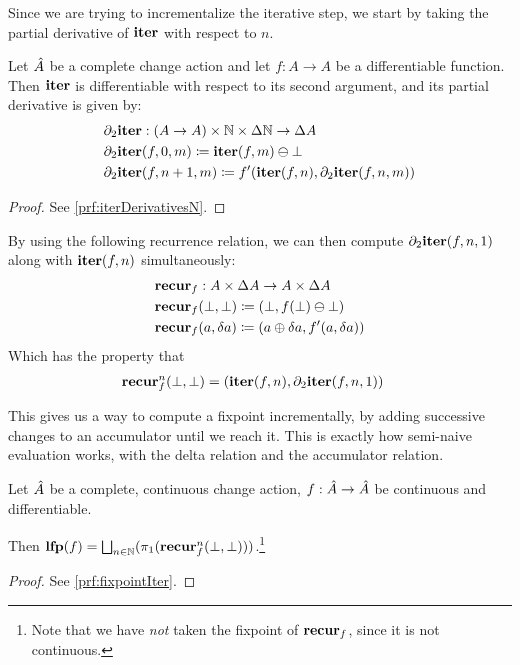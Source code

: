 Since we are trying to incrementalize the iterative step, we start by taking the partial
derivative of $\mathbf{iter}$ with respect to $n$.

\begin{prop}[name=Derivative of the iteration map with respect to $n$, restate=iterDerivativesN]
  \label{prop:iterDerivativesN}
  Let $\hat{A}$ be a complete change action and let $f: A \rightarrow A$ be a differentiable function. 
  Then $\mathbf{iter}$ is differentiable with respect to its second
  argument, and its partial derivative is given by:
  \begin{align*}
    &\partial_2{\mathbf{iter}}: (A \rightarrow A) \times \mathbb{N} \times \Delta \mathbb{N} \rightarrow \Delta A\\
    &\partial_2{\mathbf{iter}}(f, 0, m) \coloneqq \mathbf{iter}(f, m) \ominus \bot\\
    &\partial_2{\mathbf{iter}}(f, n+1, m) \coloneqq f'(\mathbf{iter}(f, n), \partial_2{\mathbf{iter}}(f, n, m))
  \end{align*}
\end{prop}
\ifproofs
\begin{proof}
  See \cref{prf:iterDerivativesN}.
\end{proof}
\fi

By using the following recurrence relation, 
we can then compute $\partial_2{\mathbf{iter}}(f, n, 1)$ along with $\mathbf{iter}(f, n)$ simultaneously:
\begin{align*}
  &\mathbf{recur}_f : A \times \Delta A \rightarrow A \times \Delta A\\
  &\mathbf{recur}_f (\bot, \bot) \coloneqq (\bot, f(\bot) \ominus \bot)\\
  &\mathbf{recur}_f (a, \delta a) \coloneqq (a \oplus \delta a, f'(a, \delta a))
\end{align*}
Which has the property that
\begin{align*}
  &\mathbf{recur}_f^n (\bot, \bot) = (\mathbf{iter}(f, n), \partial_2{\mathbf{iter}}(f, n, 1))
\end{align*}

This gives us a way to compute a fixpoint incrementally, by adding successive
changes to an accumulator until we reach it. This is exactly how
semi-naive evaluation works, with the delta relation and the accumulator relation.

\begin{thm}[name=Incremental computation of least fixpoints, restate=fixpointIter]
\label{thm:fixpointIter}
  Let $\hat{A}$ be a complete, continuous change action, $f: \hat{A} \rightarrow
  \hat{A}$ be continuous and differentiable.

  Then $\mathbf{lfp}(f) = \bigsqcup_{n \in \mathbb{N}}(\pi_1(\mathbf{recur}_f^n(\bot, \bot)))$.\footnote{
    Note that we have \emph{not} taken the fixpoint of $\mathbf{recur}_f$, since it is
    not continuous.}
\end{thm}
\ifproofs
\begin{proof}
  See \cref{prf:fixpointIter}.
\end{proof}
\fi

